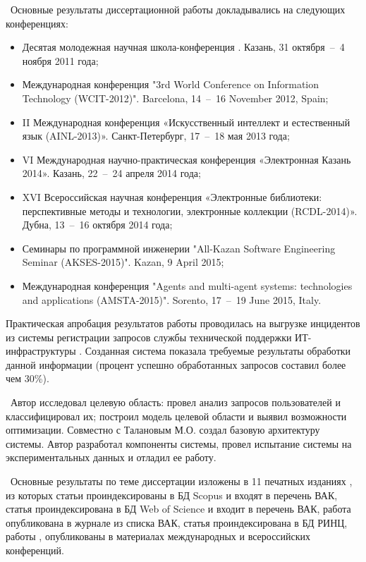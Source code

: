\probation\
 Основные результаты диссертационной работы докладывались на следующих конференциях:
\begin{itemize}
	\item Десятая молодежная научная школа-конференция . Казань, 31 октября~--~4 ноября 2011 года;
	\item Международная конференция "3rd World Conference on Information Technology (WCIT-2012)". Barcelona, 14~--~16 November 2012, Spain; 
	\item II Международная конференция «Искусственный интеллект и естественный язык (AINL-2013)». Санкт-Петербург, 17~--~18 мая 2013 года;
	\item VI Международная научно-практическая конференция «Электронная Казань 2014». Казань, 22~--~24 апреля 2014 года;
	\item XVI Всероссийская научная конференция «Электронные библиотеки: перспективные методы и технологии, электронные коллекции (RCDL-2014)». Дубна, 13~--~16 октября 2014 года;
	\item Семинары по программной инженерии "All-Kazan Software Engineering Seminar (AKSES-2015)". Kazan, 9 April 2015;
	\item Международная конференция "Agents and multi-agent systems: technologies and applications (AMSTA-2015)". Sorento, 17~--~19 June 2015, Italy.
\end{itemize} \par
Практическая апробация результатов работы проводилась на выгрузке инцидентов из системы регистрации запросов службы технической поддержки ИТ-инфраструктуры \icl. Созданная система показала требуемые результаты обработки данной информации (процент успешно обработанных запросов составил более чем 30\%). \par
\contribution\ Автор исследовал целевую область: провел анализ запросов пользователей и классифицировал их; построил модель целевой области и выявил возможности оптимизации. Совместно с Талановым М.О. создал базовую архитектуру системы. Автор разработал компоненты системы, провел испытание системы на экспериментальных данных и отладил ее работу. \par
\publications\ Основные результаты по теме диссертации изложены в 11 печатных изданиях  \cite{Lobachevskii, WCIT-2012, AINL-2013, ISGZ, IJSE-1, IJSE-2, RCDL-2014, AMSTA-2015, VAK-1, EB-1, EB-2}, из которых статьи \cite{RCDL-2014, AMSTA-2015} проиндексированы в БД Scopus и входят в перечень ВАК, статья \cite{AMSTA-2015} проиндексирована в БД Web of Science и входит в перечень ВАК, работа \cite{VAK-1} опубликована в журнале из списка ВАК, статья \cite{ISGZ} проиндексирована в БД РИНЦ, работы \cite{Lobachevskii},\cite{WCIT-2012, AINL-2013, ISGZ} опубликованы в материалах международных и всероссийских конференций.



